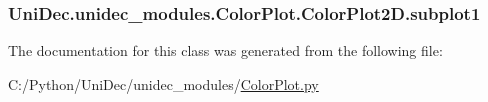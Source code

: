 \subsubsection[{subplot1}]{\setlength{\rightskip}{0pt plus 5cm}Uni\+Dec.\+unidec\+\_\+modules.\+Color\+Plot.\+Color\+Plot2\+D.\+subplot1}\label{class_uni_dec_1_1unidec__modules_1_1_color_plot_1_1_color_plot2_d_a4b77874dba36d3993a9982eaaee8b2a6}


The documentation for this class was generated from the following file\+:\begin{DoxyCompactItemize}
\item 
C\+:/\+Python/\+Uni\+Dec/unidec\+\_\+modules/\hyperlink{_color_plot_8py}{Color\+Plot.\+py}\end{DoxyCompactItemize}

